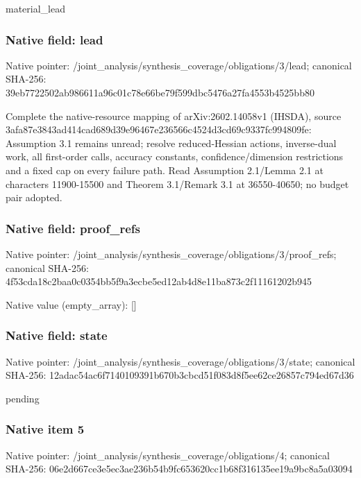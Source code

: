 \documentclass[10pt,a4paper]{article}
\begin{document}
\begingroup\raggedright\sloppy material\_\allowbreak{}lead\par\endgroup

\subsubsection{Native field: lead}
Native pointer: /joint\_\allowbreak{}analysis/synthesis\_\allowbreak{}coverage/obligations/3/lead; canonical SHA-256: 39eb7722502ab986611a96c01c78e66be79f599dbc5476a27fa4553b4525bb80

\begingroup\raggedright\sloppy Complete the native-resource mapping of arXiv:\allowbreak{}2602.14058v1 (IHSDA),\allowbreak{} source 3afa87e3843ad414cad689d39e96467e236566c4524d3cd69c9337fc994809fe:\allowbreak{} Assumption 3.1 remains unread;\allowbreak{} resolve reduced-Hessian actions,\allowbreak{} inverse-dual work,\allowbreak{} all first-order calls,\allowbreak{} accuracy constants,\allowbreak{} confidence/\allowbreak{}dimension restrictions and a fixed cap on every failure path. Read Assumption 2.1/\allowbreak{}Lemma 2.1 at characters 11900-15500 and Theorem 3.1/\allowbreak{}Remark 3.1 at 36550-40650;\allowbreak{} no budget pair adopted.\par\endgroup

\subsubsection{Native field: proof\_\allowbreak{}refs}
Native pointer: /joint\_\allowbreak{}analysis/synthesis\_\allowbreak{}coverage/obligations/3/proof\_\allowbreak{}refs; canonical SHA-256: 4f53cda18c2baa0c0354bb5f9a3ecbe5ed12ab4d8e11ba873c2f11161202b945

Native value (empty\_\allowbreak{}array): []

\subsubsection{Native field: state}
Native pointer: /joint\_\allowbreak{}analysis/synthesis\_\allowbreak{}coverage/obligations/3/state; canonical SHA-256: 12adac54ac6f7140109391b670b3cbcd51f083d8f5ee62ce26857c794ed67d36

\begingroup\raggedright\sloppy pending\par\endgroup

\subsubsection{Native item 5}
Native pointer: /joint\_\allowbreak{}analysis/synthesis\_\allowbreak{}coverage/obligations/4; canonical SHA-256: 06e2d667ce3e5ec3ae236b54b9fc653620cc1b68f316135ee19a9bc8a5a03094
\end{document}
